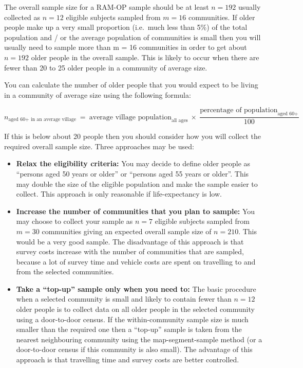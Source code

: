 \documentclass[12pt,a4paper]{book}
\theoremstyle{definition}
\theoremstyle{definition}
\theoremstyle{definition}
\theoremstyle{remark}
\begin{document}
The overall sample size for a RAM-OP sample should be at least
\(n = 192\) usually collected as \(n = 12\) eligible subjects sampled
from \(m = 16\) communities. If older people make up a very small
proportion (i.e.~much less than 5\%) of the total population and / or
the average population of communities is small then you will usually
need to sample more than m = 16 communities in order to get about
\(n = 192\) older people in the overall sample. This is likely to occur
when there are fewer than 20 to 25 older people in a community of
average size.

You can calculate the number of older people that you would expect to be
living in a community of average size using the following formula:

\[ n_{\text{aged 60+ in an average village}} ~ = ~ \text{average village population}_{\text{all ages}} ~ \times ~ \frac{\text{percentage of population}_{\text{aged 60+}}}{100} \]

If this is below about 20 people then you should consider how you will
collect the required overall sample size. Three approaches may be used:

\begin{itemize}
\item
  \textbf{Relax the eligibility criteria:} You may decide to define
  older people as ``persons aged 50 years or older'' or ``persons aged
  55 years or older''. This may double the size of the eligible
  population and make the sample easier to collect. This approach is
  only reasonable if life-expectancy is low.
\item
  \textbf{Increase the number of communities that you plan to sample:}
  You may choose to collect your sample as \(n = 7\) eligible subjects
  sampled from \(m = 30\) communities giving an expected overall sample
  size of \(n = 210\). This would be a very good sample. The
  disadvantage of this approach is that survey costs increase with the
  number of communities that are sampled, because a lot of survey time
  and vehicle costs are spent on travelling to and from the selected
  communities.
\item
  \textbf{Take a ``top-up'' sample only when you need to:} The basic
  procedure when a selected community is small and likely to contain
  fewer than \(n = 12\) older people is to collect data on all older
  people in the selected community using a door-to-door census. If the
  within-community sample size is much smaller than the required one
  then a ``top-up'' sample is taken from the nearest neighbouring
  community using the map-segment-sample method (or a door-to-door
  census if this community is also small). The advantage of this
  approach is that travelling time and survey costs are better
  controlled.
\end{itemize}
\end{document}
